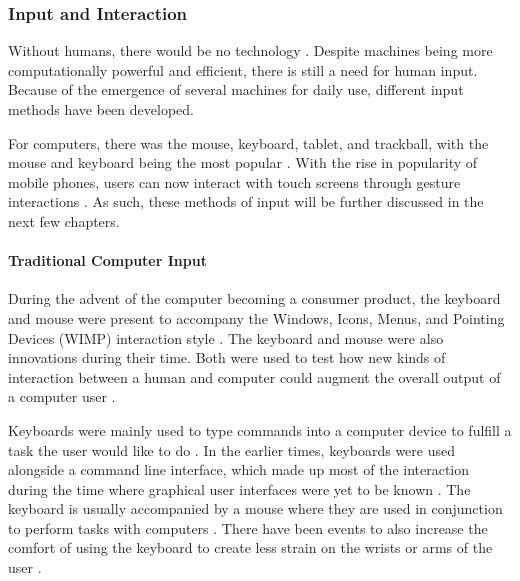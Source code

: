 	\subsubsection{Input and Interaction}
    	
        Without humans, there would be no technology \citep{commoner2014closing}. Despite machines being more computationally powerful and efficient, there is still a need for human input. Because of the emergence of several machines for daily use, different input methods have been developed. 
        
        For computers, there was the mouse, keyboard, tablet, and trackball, with the mouse and keyboard being the most popular \citep{engelbart1968a, mackenzie1991a}. With the rise in popularity of mobile phones, users can now interact with touch screens through gesture interactions \citep{chen2014agraph}. As such, these methods of input will be further discussed in the next few chapters.
    

		\paragraph{Traditional Computer Input}
        
      	During the advent of the computer becoming a consumer product, the keyboard and mouse were present to accompany the Windows, Icons, Menus, and Pointing Devices (WIMP) interaction style \citep{porta2007human}. The keyboard and mouse were also innovations during their time. Both were used to test how new kinds of interaction between a human and computer could augment the overall output of a computer user \citep{engelbart1968a}. 
        

Keyboards were mainly used to type commands into a computer device to fulfill a task the user would like to do \citep{karat1986a}. In the earlier times, keyboards were used alongside a command line interface, which made up most of the interaction during the time where graphical user interfaces were yet to be known \citep{galitz2007essential}. The keyboard is usually accompanied by a mouse where they are used in conjunction to perform tasks with computers \citep{engelbart1968a}. There have been events to also increase the comfort of using the keyboard to create less strain on the wrists or arms of the user \citep{grant1994computer}.  

